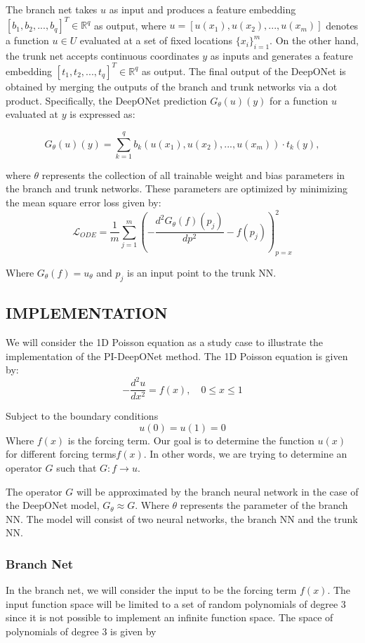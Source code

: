 \documentclass[a4paper,12pt]{article}
\theoremstyle{definition}
\begin{document}
The branch net takes $u$ as input and produces a feature embedding $[b_1, b_2, ..., b_q]^T \in \mathbb{R}^q$
as output, where $u = [u(x_1), u(x_2), ..., u(x_m)]$ denotes a function $u \in U$ evaluated at a set of 
fixed locations $\{x_i\}_{i=1}^m$. On the other hand, the trunk net accepts continuous coordinates $y$ as
inputs and generates a feature embedding $[t_1, t_2, ..., t_q]^T \in \mathbb{R}^q$ as output. The final 
output of the DeepONet is obtained by merging the outputs of the branch and trunk networks via a dot 
product. Specifically, the DeepONet prediction $G_{\theta}(u)(y)$ for a function $u$ evaluated at $y$
is expressed as:

\begin{equation}
G_{\theta}(u)(y) = \sum_{k=1}^{q} b_k(u(x_1), u(x_2), ..., u(x_m)) \cdot t_k(y),
\end{equation}

where $\theta$ represents the collection of all trainable weight and bias parameters in the branch and trunk networks. 
These parameters are optimized by minimizing the mean square error loss given by:
$$
\mathcal{L}_{ODE} = \frac{1}{m} \sum_{j=1}^{m}
\left(
-\frac{d^2 G_{\theta}(f)(p_j)}{dp^2} - f(p_j)
\right)^2_{p=x}
$$

Where $G_{\theta}(f)=u_{\theta}$ and $p_j$ is an input point to the trunk NN.

\subsection{IMPLEMENTATION}
We will consider the 1D Poisson equation as a study case to 
illustrate the implementation of the PI-DeepONet method. The 1D Poisson equation is given by:
$$
-\frac{d^2 u}{d x^2} = f(x), \quad 0 \le x \le 1
$$

Subject to the boundary conditions
$$
u(0) = u(1) = 0
$$
Where $f(x)$ is the forcing term. Our goal is to determine the function $u(x)$ for different
forcing terms$f(x)$. In other words, we are trying to determine an
operator $G$ such that $G:f \rightarrow u$.

The operator $G$ will be approximated by the branch neural network in the case of
the DeepONet model, $G_{\theta} \approx G$. Where $\theta$ represents the parameter 
of the branch NN.
The model will consist of two neural networks, the branch NN and the trunk NN. 

\subsubsection{Branch Net}
In the branch net, we will consider the input to be the forcing term $f(x)$.
The input function space will be limited to a set of random polynomials of degree 3 
since it is not possible to implement an infinite function space. The space of polynomials
of degree 3 is given by 
\end{document}
